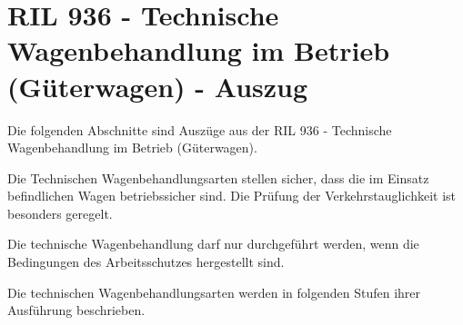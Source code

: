 \section{RIL 936 - Technische Wagenbehandlung im Betrieb (Güterwagen) - Auszug}\label{sec:ATWb}
Die folgenden Abschnitte sind Auszüge aus der RIL 936 - Technische Wagenbehandlung im Betrieb (Güterwagen).\cite{RIL936}\par
Die Technischen Wagenbehandlungsarten stellen sicher, dass die im Einsatz befindlichen Wagen betriebssicher
sind. Die Prüfung der Verkehrstauglichkeit ist besonders geregelt.\par 
Die technische Wagenbehandlung darf nur durchgeführt werden, wenn die Bedingungen des Arbeitsschutzes hergestellt
sind.\par
Die technischen Wagenbehandlungsarten werden in folgenden Stufen ihrer Ausführung beschrieben.
